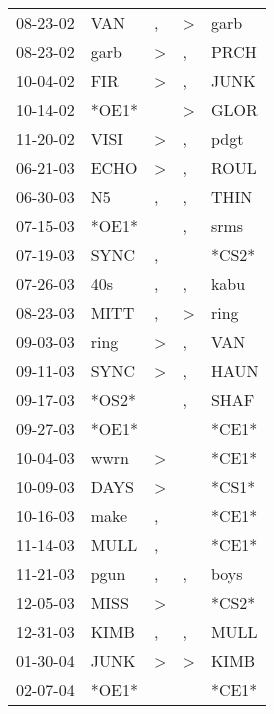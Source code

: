 \begin{supertabular}{lllll}
 08-23-02 &    VAN &                , &     \textgreater &   garb \\
 08-23-02 &   garb &     \textgreater &                , &   PRCH \\
 10-04-02 &    FIR &     \textgreater &                , &   JUNK \\
 10-14-02 &  *OE1* &                  &     \textgreater &   GLOR \\
 11-20-02 &   VISI &     \textgreater &                , &   pdgt \\
 06-21-03 &   ECHO &     \textgreater &                , &   ROUL \\
 06-30-03 &     N5 &                , &                , &   THIN \\
 07-15-03 &  *OE1* &                  &                , &   srms \\
 07-19-03 &   SYNC &                , &                  &  *CS2* \\
 07-26-03 &    40s &                , &                , &   kabu \\
 08-23-03 &   MITT &                , &     \textgreater &   ring \\
 09-03-03 &   ring &     \textgreater &                , &    VAN \\
 09-11-03 &   SYNC &     \textgreater &                , &   HAUN \\
 09-17-03 &  *OS2* &                  &                , &   SHAF \\
 09-27-03 &  *OE1* &                  &                  &  *CE1* \\
 10-04-03 &   wwrn &     \textgreater &                  &  *CE1* \\
 10-09-03 &   DAYS &     \textgreater &                  &  *CS1* \\
 10-16-03 &   make &                , &                  &  *CE1* \\
 11-14-03 &   MULL &                , &                  &  *CE1* \\
 11-21-03 &   pgun &                , &                , &   boys \\
 12-05-03 &   MISS &     \textgreater &                  &  *CS2* \\
 12-31-03 &   KIMB &                , &                , &   MULL \\
 01-30-04 &   JUNK &     \textgreater &     \textgreater &   KIMB \\
 02-07-04 &  *OE1* &                  &                  &  *CE1* \\

\end{supertabular}
